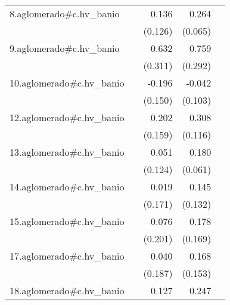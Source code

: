 {\begin{longtable}{l*{4}{D{.}{.}{-1}}}
\addlinespace
8.aglomerado#c.hv\_banio&                     &       0.136         &       0.264\sym{***}&                     \\
            &                     &     (0.126)         &     (0.065)         &                     \\
\addlinespace
9.aglomerado#c.hv\_banio&                     &       0.632\sym{*}  &       0.759\sym{**} &                     \\
            &                     &     (0.311)         &     (0.292)         &                     \\
\addlinespace
10.aglomerado#c.hv\_banio&                     &      -0.196         &      -0.042         &                     \\
            &                     &     (0.150)         &     (0.103)         &                     \\
\addlinespace
12.aglomerado#c.hv\_banio&                     &       0.202         &       0.308\sym{**} &                     \\
            &                     &     (0.159)         &     (0.116)         &                     \\
\addlinespace
13.aglomerado#c.hv\_banio&                     &       0.051         &       0.180\sym{**} &                     \\
            &                     &     (0.124)         &     (0.061)         &                     \\
\addlinespace
14.aglomerado#c.hv\_banio&                     &       0.019         &       0.145         &                     \\
            &                     &     (0.171)         &     (0.132)         &                     \\
\addlinespace
15.aglomerado#c.hv\_banio&                     &       0.076         &       0.178         &                     \\
            &                     &     (0.201)         &     (0.169)         &                     \\
\addlinespace
17.aglomerado#c.hv\_banio&                     &       0.040         &       0.168         &                     \\
            &                     &     (0.187)         &     (0.153)         &                     \\
\addlinespace
18.aglomerado#c.hv\_banio&                     &       0.127         &       0.247\sym{***}&                     \\

\end{longtable}}
